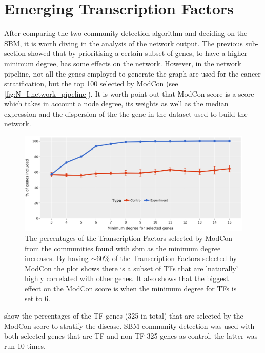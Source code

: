 
\section{Emerging Transcription Factors} \label{s:N_I:sel_tfs}

After comparing the two community detection algorithm and deciding on the SBM, it is worth diving in the analysis of the network output. The previous sub-section showed that by prioritising a certain subset of genes, to have a higher minimum degree, has some effects on the network. However, in the network pipeline, not all the genes employed to generate the graph are used for the cancer stratification, but the top 100 selected by ModCon (see \cref{fig:N_I:network_pipeline}). It is worth point out that ModCon score is a score which takes in account a node degree, its weights as well as the median expression and the dispersion of the  the gene in the dataset used to build the network.


\begin{figure}[!b]   
    \centering
    \includegraphics[width=1.0\textwidth,height=1.0\textheight,keepaspectratio]{Sections/Network_I/Resources/selective_pruning/com_comp/ctrls_min_dig_mev.png}
      \caption{The percentages of the Transcription Factors selected by ModCon from the communities found with \acrlong{sbm} as the minimum degree increases. By having $\sim60\%$ of the Transcription Factors selected by ModCon the plot shows there is a subset of TFs that are 'naturally' highly correlated with other genes. It also shows that the biggest effect on the ModCon score is when the minimum degree for TFs is set to 6.}
    \label{fig:N_I:sel_tfs}
\end{figure}

 show the percentages of the TF genes (325 in total) that are selected by the ModCon score to stratify the disease. SBM community detection was used with both selected genes that are TF and non-TF 325 genes as control, the latter was run 10 times.

